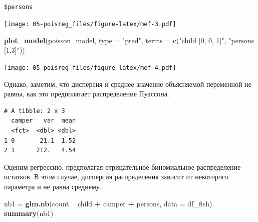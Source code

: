 \documentclass[]{book}
\newenvironment{Shaded}{\begin{snugshade}}{\end{snugshade}}
\newcommand{\DataTypeTok}[1]{\textcolor[rgb]{0.13,0.29,0.53}{#1}}
\newcommand{\KeywordTok}[1]{\textcolor[rgb]{0.13,0.29,0.53}{\textbf{#1}}}
\newcommand{\NormalTok}[1]{#1}
\newcommand{\OperatorTok}[1]{\textcolor[rgb]{0.81,0.36,0.00}{\textbf{#1}}}
\newcommand{\StringTok}[1]{\textcolor[rgb]{0.31,0.60,0.02}{#1}}
\begin{document}
\begin{verbatim}

$persons
\end{verbatim}

\texttt{[image: 05-poisreg\_files/figure-latex/mef-3.pdf]}

\begin{Shaded}
\begin{Highlighting}[]
\KeywordTok{plot_model}\NormalTok{(poisson_model, }\DataTypeTok{type =} \StringTok{"pred"}\NormalTok{, }\DataTypeTok{terms =} \KeywordTok{c}\NormalTok{(}\StringTok{"child [0, 0, 1]"}\NormalTok{, }\StringTok{"persons [1,3]"}\NormalTok{))}
\end{Highlighting}
\end{Shaded}

\texttt{[image: 05-poisreg\_files/figure-latex/mef-4.pdf]}

Однако, заметим, что дисперсия и среднее значение объясняемой переменной не равны, как это предполагает распределение Пуассона.

\begin{Shaded}
\end{Shaded}

\begin{verbatim}
# A tibble: 2 x 3
  camper   var  mean
  <fct>  <dbl> <dbl>
1 0       21.1  1.52
2 1      212.   4.54
\end{verbatim}

Оценим регрессию, предполагая отрицательное биномиальное распределение остатков. В этом случае, дисперсия распределения зависит от некоторого параметра и не равна среднему.

\begin{Shaded}
\begin{Highlighting}[]
\NormalTok{nb1 =}\StringTok{ }\KeywordTok{glm.nb}\NormalTok{(count }\OperatorTok{~}\StringTok{ }\NormalTok{child }\OperatorTok{+}\StringTok{ }\NormalTok{camper }\OperatorTok{+}\StringTok{  }\NormalTok{persons, }\DataTypeTok{data =}\NormalTok{ df_fish)}
\KeywordTok{summary}\NormalTok{(nb1)}
\end{Highlighting}
\end{Shaded}
\end{document}
